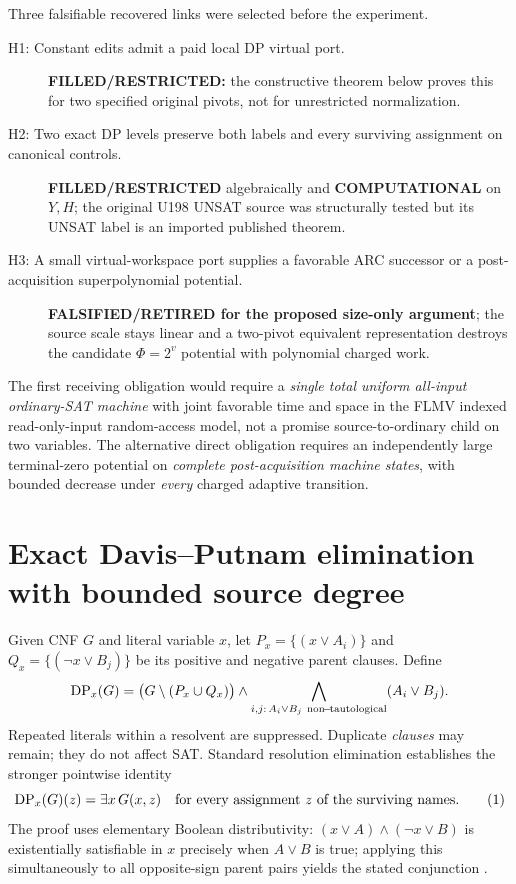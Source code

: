 \documentclass[11pt]{article}
\begin{document}
Three falsifiable recovered links were selected before the experiment.
\begin{description}
\item[H1: Constant edits admit a paid local DP virtual port.] \textbf{FILLED/RESTRICTED:} the constructive theorem below proves this for two specified original pivots, not for unrestricted normalization.
\item[H2: Two exact DP levels preserve both labels and every surviving assignment on canonical controls.] \textbf{FILLED/RESTRICTED} algebraically and \textbf{COMPUTATIONAL} on $Y,H$; the original U198 UNSAT source was structurally tested but its UNSAT label is an imported published theorem.
\item[H3: A small virtual-workspace port supplies a favorable ARC successor or a post-acquisition superpolynomial potential.] \textbf{FALSIFIED/RETIRED for the proposed size-only argument}; the source scale stays linear and a two-pivot equivalent representation destroys the candidate $\Phi=2^{v}$ potential with polynomial charged work.
\end{description}
The first receiving obligation would require a \emph{single total uniform all-input ordinary-SAT machine} with joint favorable time and space in the FLMV indexed read-only-input random-access model, not a promise source-to-ordinary child on two variables. The alternative direct obligation requires an independently large terminal-zero potential on \emph{complete post-acquisition machine states}, with bounded decrease under \emph{every} charged adaptive transition.

\section{Exact Davis--Putnam elimination with bounded source degree}
Given CNF $G$ and literal variable $x$, let $P_x=\{(x\lor A_i)\}$ and $Q_x=\{(\neg x\lor B_j)\}$ be its positive and negative parent clauses. Define
\[
 {\rm DP}_x(G)=
 \bigl(G\setminus(P_x\cup Q_x)\bigr)\wedge
 \bigwedge_{i,j:\,A_i\lor B_j\ {\rm non\!-\!tautological}}
 (A_i\lor B_j).
\]
Repeated literals within a resolvent are suppressed. Duplicate \emph{clauses} may remain; they do not affect SAT. Standard resolution elimination establishes the stronger pointwise identity
\[
        {\rm DP}_x(G)(z)=\exists x\,G(x,z)
        \quad\text{for every assignment }z\text{ of the surviving names}.
        \tag{1}
\]
The proof uses elementary Boolean distributivity:
$(x\lor A)\wedge(\neg x\lor B)$ is existentially satisfiable in $x$ precisely when $A\lor B$ is true; applying this simultaneously to all opposite-sign parent pairs yields the stated conjunction \cite{dp,eenbiere}.
\end{document}

